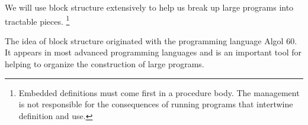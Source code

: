 
We will use block structure extensively to help us break up large
programs into tractable pieces. \footnote{Embedded definitions must
  come first in a procedure body.  The management is not responsible
  for the consequences of running programs that intertwine definition
  and use.}

The idea of block structure originated with the programming language
Algol 60.  It appears in most advanced programming languages and is an
important tool for helping to organize the construction of large
programs.

